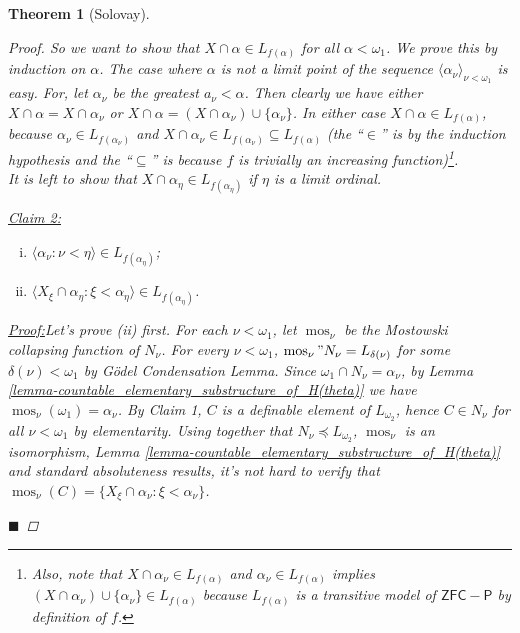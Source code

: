 \documentclass[11pt,a4paper]{report}
\newtheorem{theorem}{Theorem}[chapter] %
\theoremstyle{definition}
\theoremstyle{num.custom-title}
\theoremstyle{custom-title}
\newenvironment{claim}[1]{\par\noindent\underline{Claim#1:}\space}{} %
\newenvironment{claimproof}[1]{\par\noindent\underline{Proof:}\space#1}{\leavevmode\unskip\penalty9999 \hbox{}\nobreak\hfill\quad\hbox{$\blacksquare$}} %
\DeclareMathOperator{\sse}{\subseteq}
\DeclareMathOperator{\mos}{mos}
\begin{document}
\begin{theorem}[Solovay]
\begin{proof}
So we want to show that $X \cap \alpha \in L_{f(\alpha)}$ for all $\alpha < \omega_1$. We prove this by induction on $\alpha$. The case where $\alpha$ is not a limit point of the sequence $\langle \alpha_\nu \rangle_{\nu < \omega_1}$ is easy. For, let $\alpha_\nu$ be the greatest $a_\nu < \alpha$. Then clearly we have either $X \cap \alpha = X \cap \alpha_\nu$ or $X \cap \alpha = (X \cap \alpha_\nu) \cup \{\alpha_\nu\}$. In either case $X \cap \alpha \in L_{f(\alpha)}$, because $\alpha_\nu \in L_{f(\alpha_\nu)}$ and $X \cap \alpha_\nu \in L_{f(\alpha_\nu)} \sse L_{f(\alpha)}$ (the ``$\in$'' is by the induction hypothesis and the ``$\sse$'' is because $f$ is trivially an increasing function)\footnote{Also, note that $X \cap \alpha_\nu \in L_{f(\alpha)}$ and $\alpha_\nu \in L_{f(\alpha)}$ implies $(X \cap \alpha_\nu) \cup \{\alpha_\nu\} \in L_{f(\alpha)}$ because $L_{f(\alpha)}$ is a transitive model of $\mathsf{ZFC-P}$ by definition of $f$.}.\\
It is left to show that $X \cap \alpha_\eta \in L_{f(\alpha_\eta)}$ if $\eta$ is a limit ordinal.
\begin{claim}{ 2}
\begin{enumerate}[(i)]
\item $\langle \alpha_\nu : \nu < \eta \rangle \in L_{f(\alpha_\eta)}$;
\item $\langle X_\xi \cap \alpha_\eta : \xi < \alpha_\eta \rangle \in L_{f(\alpha_\eta)}$.
\end{enumerate}
\begin{claimproof}
Let's prove (ii) first. For each $\nu < \omega_1$, let $\mos_\nu$ be the Mostowski collapsing function of $N_\nu$. For every $\nu < \omega_1$, $\mos_\nu "N_\nu = L_{\delta(\nu)}$ for some $\delta(\nu) < \omega_1$ by Gödel Condensation Lemma. Since $\omega_1 \cap N_\nu = \alpha_\nu$, by Lemma \ref{lemma-countable_elementary_substructure_of_H(theta)} we have $\mos_\nu(\omega_1) = \alpha_\nu$. By Claim 1, $C$ is a definable element of $L_{\omega_2}$, hence $C \in N_\nu$ for all $\nu < \omega_1$ by elementarity. Using together that $N_\nu \preceq L_{\omega_2}$, $\mos_\nu$ is an isomorphism, Lemma \ref{lemma-countable_elementary_substructure_of_H(theta)} and standard absoluteness results, it's not hard to verify that $\mos_\nu(C) = \{ X_\xi \cap \alpha_\nu : \xi < \alpha_\nu \}$.


\end{claimproof}
\end{claim}
\end{proof}
\end{theorem}
\end{document}
